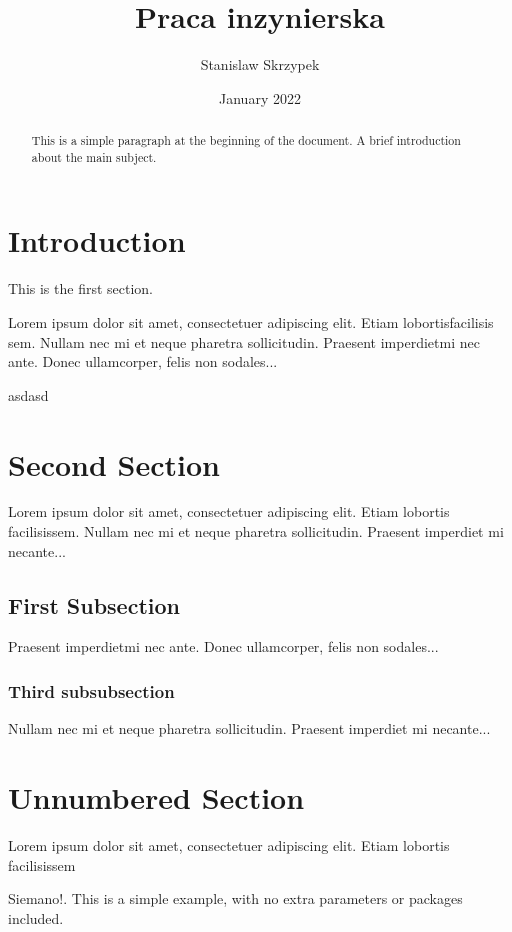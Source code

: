 \documentclass[11pt, a4]{article}
\title{Praca inzynierska}
\author{Stanislaw Skrzypek}
\date{January 2022}
\begin{document}
\maketitle

\begin{abstract}
    This is a simple paragraph at the beginning of the 
    document. A brief introduction about the main subject.
\end{abstract}

\tableofcontents

\section{Introduction}

This is the first section.

Lorem  ipsum  dolor  sit  amet,  consectetuer  adipiscing  
elit.   Etiam  lobortisfacilisis sem.  Nullam nec mi et 
neque pharetra sollicitudin.  Praesent imperdietmi nec ante. 
Donec ullamcorper, felis non sodales...

asdasd

\section{Second Section}

Lorem ipsum dolor sit amet, consectetuer adipiscing elit.  
Etiam lobortis facilisissem.  Nullam nec mi et neque pharetra 
sollicitudin.  Praesent imperdiet mi necante...

\subsection{First Subsection}
Praesent imperdietmi nec ante. Donec ullamcorper, felis non sodales...

\subsubsection{Third subsubsection}
Nullam nec mi et neque pharetra 
sollicitudin.  Praesent imperdiet mi necante...

\section*{Unnumbered Section}
Lorem ipsum dolor sit amet, consectetuer adipiscing elit.  
Etiam lobortis facilisissem

Siemano!. This is a simple example, with no 
extra parameters or packages included.
\end{document}

